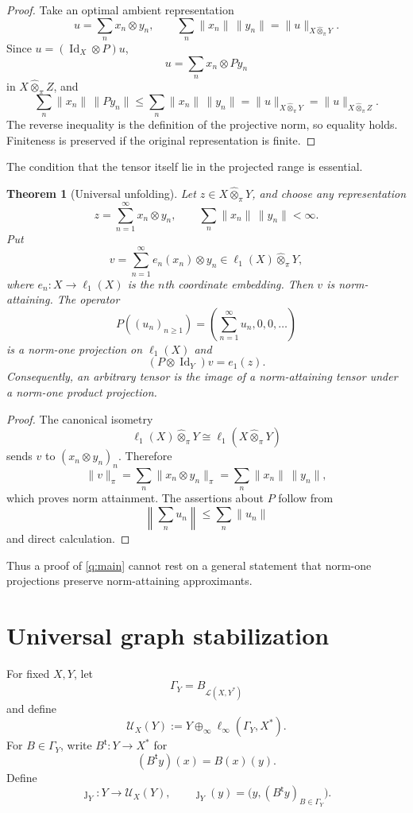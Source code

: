 \documentclass[11pt]{article}
\newtheorem{theorem}{Theorem}[section]
\theoremstyle{definition}
\theoremstyle{remark}
\newcommand{\whot}{\widehat\otimes_\pi}
\newcommand{\Lin}{\mathcal L}
\newcommand{\id}{\operatorname{Id}}
\newcommand{\U}{\mathcal U}
\begin{document}
\begin{proof}
Take an optimal ambient representation
\[
 u=\sum_nx_n\otimes y_n,
 \qquad
 \sum_n\|x_n\|\,\|y_n\|=\|u\|_{X\whot Y}.
\]
Since $u=(\id_X\otimes P)u$,
\[
 u=\sum_nx_n\otimes P y_n
\]
in $X\whot Z$, and
\[
 \sum_n\|x_n\|\,\|Py_n\|
 \leq\sum_n\|x_n\|\,\|y_n\|
 =\|u\|_{X\whot Y}
 =\|u\|_{X\whot Z}.
\]
The reverse inequality is the definition of the projective norm, so equality holds.  Finiteness is preserved if the original representation is finite.
\end{proof}

The condition that the tensor itself lie in the projected range is essential.

\begin{theorem}[Universal unfolding]\label{thm:unfolding}
Let $z\in X\whot Y$, and choose any representation
\[
 z=\sum_{n=1}^\infty x_n\otimes y_n,
 \qquad
 \sum_n\|x_n\|\,\|y_n\|<\infty.
\]
Put
\[
 v=\sum_{n=1}^\infty e_n(x_n)\otimes y_n
 \in\ell_1(X)\whot Y,
\]
where $e_n:X\to\ell_1(X)$ is the $n$th coordinate embedding.  Then $v$ is norm-attaining.  The operator
\[
 P((u_n)_{n\geq1})=
 \left(\sum_{n=1}^\infty u_n,0,0,\ldots\right)
\]
is a norm-one projection on $\ell_1(X)$ and
\[
 (P\otimes\id_Y)v=e_1(z).
\]
Consequently, an arbitrary tensor is the image of a norm-attaining tensor under a norm-one product projection.
\end{theorem}

\begin{proof}
The canonical isometry
\[
 \ell_1(X)\whot Y\cong\ell_1(X\whot Y)
\]
sends $v$ to $(x_n\otimes y_n)_n$.  Therefore
\[
 \|v\|_\pi
 =\sum_n\|x_n\otimes y_n\|_\pi
 =\sum_n\|x_n\|\,\|y_n\|,
\]
which proves norm attainment.  The assertions about $P$ follow from
\[
 \left\|\sum_nu_n\right\|\leq\sum_n\|u_n\|
\]
and direct calculation.
\end{proof}

Thus a proof of \cref{q:main} cannot rest on a general statement that norm-one projections preserve norm-attaining approximants.

\section{Universal graph stabilization}

For fixed $X,Y$, let
\[
 \Gamma_Y=B_{\Lin(X,Y^*)}
\]
and define
\[
 \U_X(Y)
 :=Y\oplus_\infty\ell_\infty(\Gamma_Y,X^*).
\]
For $B\in\Gamma_Y$, write $B^{\mathsf t}:Y\to X^*$ for
\[
 (B^{\mathsf t}y)(x)=B(x)(y).
\]
Define
\[
 \jmath_Y:Y\longrightarrow\U_X(Y),
 \qquad
 \jmath_Y(y)=\bigl(y,(B^{\mathsf t}y)_{B\in\Gamma_Y}\bigr).
\]
\end{document}
